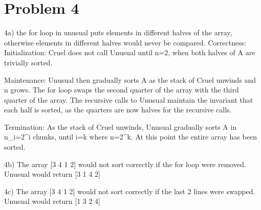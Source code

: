 \documentclass{article}
\begin{document}
\section*{Problem 4}
4a) the for loop in unusual puts elements in different halves of the array, otherwise elements in different halves would never be compared.
Correctness: 
    Initialization: Cruel does not call Unusual until n=2, when both halves of A are trivially sorted. 
    
    Maintenance: Unusual then gradually sorts A as the stack of Cruel unwinds and n grows. The for loop swaps the second quarter of the array with the 
    third quarter of the array.  The recursive calls to Unusual maintain the invariant that each half is sorted, as the quarters are now 
    halves for the recursive calls.
    
    Termination: As the stack of Cruel unwinds, Unusual gradually sorts A in n_i=2^i chunks, until i=k where n=2^k.  At this point the entire array
    has been sorted.

4b) The array [3 4 1 2] would not sort correctly if the for loop were removed.  Unusual would return [3 1 4 2]

4c) The array [3 4 1 2] would not sort correctly if the last 2 lines were swapped.  Unusual would return [1 3 2 4]
\end{document}
